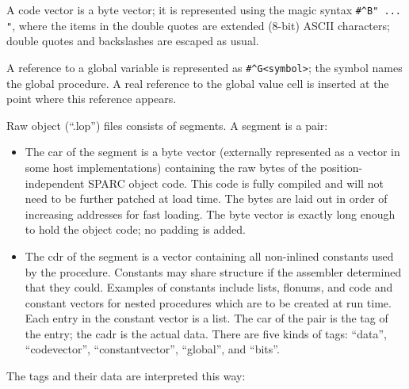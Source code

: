 A code vector is a byte vector; it is represented using the magic syntax
\verb+#^B" ... "+, where the items in the double quotes are extended (8-bit)
ASCII characters; double quotes and backslashes are escaped as usual.

A reference to a global variable is represented as \verb+#^G<symbol>+; the
symbol names the global procedure. A real reference to the global value cell
is inserted at the point where this reference appears.

Raw object (``.lop'') files consists of segments. A segment is a pair:

\begin{itemize}
\item
The car of the segment is a byte vector (externally represented as a vector
in some host implementations) containing the raw bytes of the
position-independent SPARC object code. This code is fully compiled and will
not need to be further patched at load time. The bytes are laid out in order
of increasing addresses for fast loading. The byte vector is exactly long
enough to hold the object code; no padding is added.

\item
The cdr of the segment is a vector containing all non-inlined constants
used by the procedure. Constants may share structure if the assembler
determined that they could. Examples of constants include lists, flonums, 
and code and constant vectors for nested procedures which are to be created
at run time. Each entry in the constant vector is a list. The car of the
pair is the tag of the entry; the cadr is the actual data. There are five
kinds of tags: ``data'', ``codevector'', ``constantvector'', ``global'',
and ``bits''. 
\end{itemize}

The tags and their data are interpreted this way:

